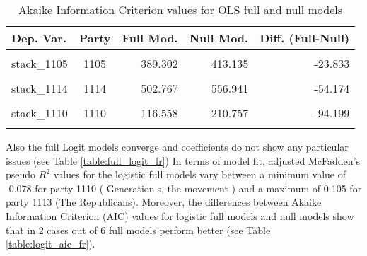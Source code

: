 \documentclass[
]{article}
\begin{document}
\begin{table}[!h]

\caption{\label{tab:unnamed-chunk-68}Akaike Information Criterion values for OLS full and null models 
        \label{table:ols_aic_fr}}
\centering
\begin{tabular}[t]{lcrrr}
\toprule
Dep. Var. & Party & Full Mod. & Null Mod. & Diff. (Full-Null)\\
\midrule
\cellcolor{gray!6}{stack\_1113} & \cellcolor{gray!6}{1113} & \cellcolor{gray!6}{403.730} & \cellcolor{gray!6}{484.329} & \cellcolor{gray!6}{-80.599}\\
stack\_1105 & 1105 & 389.302 & 413.135 & -23.833\\
\cellcolor{gray!6}{stack\_1111} & \cellcolor{gray!6}{1111} & \cellcolor{gray!6}{793.339} & \cellcolor{gray!6}{817.144} & \cellcolor{gray!6}{-23.805}\\
stack\_1114 & 1114 & 502.767 & 556.941 & -54.174\\
\cellcolor{gray!6}{stack\_1101} & \cellcolor{gray!6}{1101} & \cellcolor{gray!6}{372.314} & \cellcolor{gray!6}{453.519} & \cellcolor{gray!6}{-81.205}\\
\addlinespace
stack\_1110 & 1110 & 116.558 & 210.757 & -94.199\\
\cellcolor{gray!6}{stack\_1102} & \cellcolor{gray!6}{1102} & \cellcolor{gray!6}{657.229} & \cellcolor{gray!6}{705.587} & \cellcolor{gray!6}{-48.357}\\
\bottomrule
\end{tabular}
\end{table}

Also the full Logit models converge and coefficients do not show any particular issues (see Table \ref{table:full_logit_fr})
In terms of model fit, adjusted McFadden's pseudo \(R^2\) values for the logistic full models vary between
a minimum value of
-0.078
for party 1110
( Generation.s, the movement )
and a maximum of
0.105
for party 1113
(The Republicans).
Moreover, the differences between Akaike Information Criterion (AIC) values for logistic full models and
null models show that in 2 cases out of 6 full models perform better (see Table
\ref{table:logit_aic_fr}).
\end{document}
